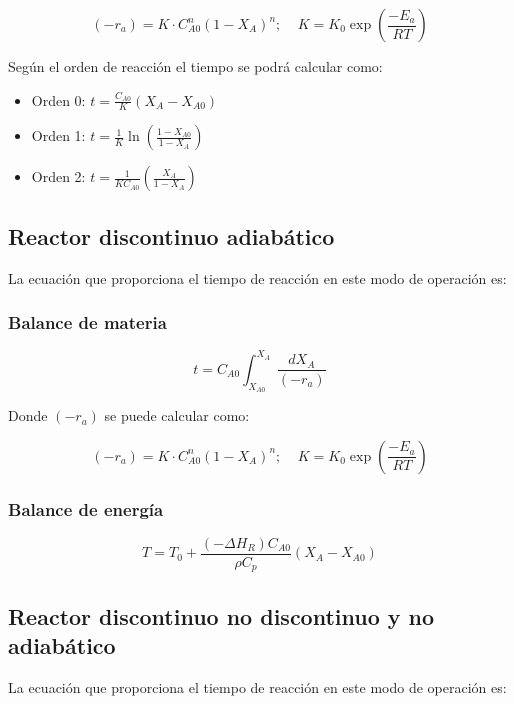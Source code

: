 \documentclass[20pt,a4paper]{extarticle}
\begin{document}
		\begin{equation*}
			(-r_a) = K \cdot C_{A0}^n (1-X_A)^n; ~~~~~ K = K_0\exp\left(\frac{-E_a}{RT}\right)
		\end{equation*}
		
		Según el orden de reacción el tiempo se podrá calcular como:
		
		\begin{itemize}
			\item Orden 0: $ t = \frac{C_{A0}}{K}(X_A-X_{A0})$
			\item Orden 1: $ t = \frac{1}{K}\ln\left(\frac{1-X_{A0}}{1-X_A}\right)$
			\item Orden 2: $ t = \frac{1}{KC_{A0}}\left(\frac{X_A}{1- X_A}\right)$
		\end{itemize}
	
	
	\subsection{Reactor discontinuo adiabático}
		La ecuación que proporciona el tiempo de reacción en este modo de operación es:
	
		\subsubsection{Balance de materia}
			\begin{equation*}
			t = C_{A0}\int_{X_{A0}}^{X_A}\frac{dX_A}{(-r_a)}
			\end{equation*}
			
			Donde $(-r_a)$ se puede calcular como:
			
			\begin{equation*}
			(-r_a) = K \cdot C_{A0}^n (1-X_A)^n; ~~~~~ K = K_0\exp\left(\frac{-E_a}{RT}\right)
			\end{equation*}
			
		\subsubsection{Balance de energía}
			\begin{equation*}
				T = T_0 + \frac{(-\Delta H_R)C_{A0}}{\rho C_p}(X_A-X_{A0})
			\end{equation*}
			
	\subsection{Reactor discontinuo no discontinuo y no adiabático}
		La ecuación que proporciona el tiempo de reacción en este modo de operación es:
		
\end{document}
